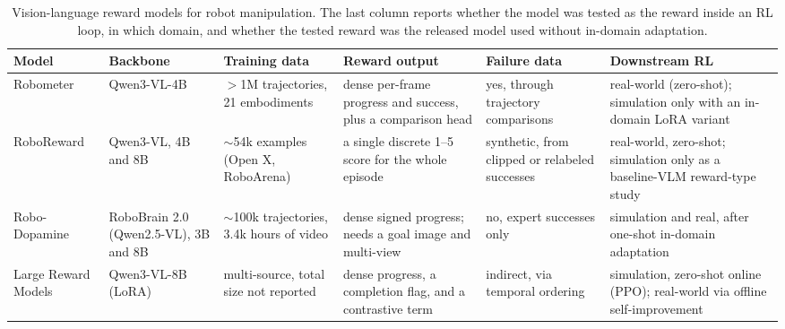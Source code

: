 \begin{table}[t]
\centering
\footnotesize
\caption[Vision-language reward models compared]{Vision-language reward models for robot manipulation. The last column reports whether the model was tested as the reward inside an RL loop, in which domain, and whether the tested reward was the released model used without in-domain adaptation.}
\label{tab:vlm-reward-models}
\begin{tabular}{@{}p{2.0cm}p{1.9cm}p{2.3cm}p{2.9cm}p{2.0cm}p{3.2cm}@{}}
\toprule
Model & Backbone & Training data & Reward output & Failure data & Downstream RL \\
\midrule
Robometer \citep{robometer} & Qwen3-VL-4B & $>$1M trajectories, 21 embodiments & dense per-frame progress and success, plus a comparison head & yes, through trajectory comparisons & real-world (zero-shot); simulation only with an in-domain LoRA variant \\
\addlinespace
RoboReward \citep{roboreward} & Qwen3-VL, 4B and 8B & $\sim$54k examples (Open X, RoboArena) & a single discrete 1--5 score for the whole episode &synthetic, from clipped or relabeled successes & real-world, zero-shot; simulation only as a baseline-VLM reward-type study \\
\addlinespace
Robo-Dopamine \citep{robodopamine} & RoboBrain 2.0 (Qwen2.5-VL), 3B and 8B & $\sim$100k trajectories, 3.4k hours of video & dense signed progress; needs a goal image and multi-view & no, expert successes only & simulation and real, after one-shot in-domain adaptation \\
\addlinespace
Large Reward Models \citep{TRI-reward-model} & Qwen3-VL-8B (LoRA) & multi-source, total size not reported & dense progress, a completion flag, and a contrastive term & indirect, via temporal ordering & simulation, zero-shot online (PPO); real-world via offline self-improvement \\
\bottomrule
\end{tabular}
\end{table}

